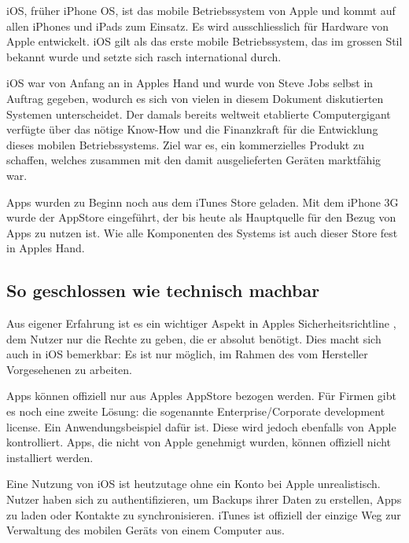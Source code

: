 iOS, früher iPhone OS, ist das mobile Betriebssystem von Apple und kommt auf allen iPhones und iPads zum Einsatz. Es wird ausschliesslich für Hardware von Apple entwickelt\thinspace\cite{online:ios-wikipedia}. iOS gilt als das erste mobile Betriebssystem, das im grossen Stil bekannt wurde und setzte sich rasch international durch.

iOS war von Anfang an in Apples Hand und wurde von Steve Jobs selbst in Auftrag gegeben, wodurch es sich von vielen in diesem Dokument diskutierten Systemen unterscheidet\thinspace\cite{online:ios-wikipedia}. Der damals bereits weltweit etablierte Computergigant verfügte über das nötige Know-How und die Finanzkraft für die Entwicklung dieses mobilen Betriebssystems. Ziel war es, ein kommerzielles Produkt zu schaffen, welches zusammen mit den damit ausgelieferten Geräten marktfähig war.

Apps wurden zu Beginn noch aus dem iTunes Store geladen\thinspace\cite{online:ios-appstore}. Mit dem iPhone 3G wurde der AppStore eingeführt, der bis heute als Hauptquelle für den Bezug von Apps zu nutzen ist. Wie alle Komponenten des Systems ist auch dieser Store fest in Apples Hand.\\

\subsection{So geschlossen wie technisch machbar}
Aus eigener Erfahrung ist es ein wichtiger Aspekt in Apples Sicherheitsrichtline , dem Nutzer nur die Rechte zu geben, die er absolut benötigt. Dies macht sich auch in iOS bemerkbar: Es ist nur möglich, im Rahmen des vom Hersteller Vorgesehenen zu arbeiten.

Apps können offiziell nur aus Apples AppStore bezogen werden. Für Firmen gibt es noch eine zweite Lösung: die sogenannte Enterprise/Corporate development license. Ein Anwendungsbeispiel dafür ist\thinspace\cite{online:ios-xamarin}. Diese wird jedoch ebenfalls von Apple kontrolliert\thinspace\cite{online:ios-appsfromoutside}. Apps, die nicht von Apple genehmigt wurden, können offiziell nicht installiert werden\thinspace\cite{online:ios-appstore}.

Eine Nutzung von iOS ist heutzutage ohne ein Konto bei Apple unrealistisch. Nutzer haben sich zu authentifizieren, um Backups ihrer Daten zu erstellen, Apps zu laden oder Kontakte zu synchronisieren. iTunes ist offiziell der einzige Weg zur Verwaltung des mobilen Geräts von einem Computer aus.

